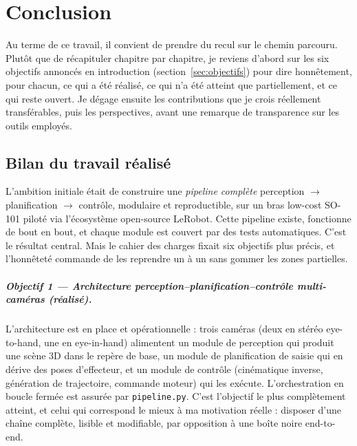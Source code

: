 \chapter{Conclusion}
\label{ch:conclusion}

Au terme de ce travail, il convient de prendre du recul sur le chemin parcouru.
Plutôt que de récapituler chapitre par chapitre, je reviens d'abord sur les six
objectifs annoncés en introduction (section~\ref{sec:objectifs}) pour dire
honnêtement, pour chacun, ce qui a été réalisé, ce qui n'a été atteint que
partiellement, et ce qui reste ouvert. Je dégage ensuite les contributions que
je crois réellement transférables, puis les perspectives, avant une remarque de
transparence sur les outils employés.

\section{Bilan du travail réalisé}
\label{sec:concl_bilan}

L'ambition initiale était de construire une \emph{pipeline complète} perception
$\rightarrow$ planification $\rightarrow$ contrôle, modulaire et reproductible,
sur un bras low-cost SO-101 piloté via l'écosystème open-source LeRobot. Cette
pipeline existe, fonctionne de bout en bout, et chaque module est couvert par
des tests automatiques. C'est le résultat central. Mais le cahier des charges
fixait six objectifs plus précis, et l'honnêteté commande de les reprendre un à
un sans gommer les zones partielles.

\paragraph{Objectif 1 --- Architecture perception--planification--contrôle
multi-caméras (\emph{réalisé}).} L'architecture est en place et opérationnelle :
trois caméras (deux en stéréo eye-to-hand, une en eye-in-hand) alimentent un
module de perception qui produit une scène 3D dans le repère de base, un module
de planification de saisie qui en dérive des poses d'effecteur, et un module de
contrôle (cinématique inverse, génération de trajectoire, commande moteur) qui
les exécute. L'orchestration en boucle fermée est assurée par
\texttt{pipeline.py}. C'est l'objectif le plus complètement atteint, et celui
qui correspond le mieux à ma motivation réelle : disposer d'une chaîne complète,
lisible et modifiable, par opposition à une boîte noire end-to-end.

